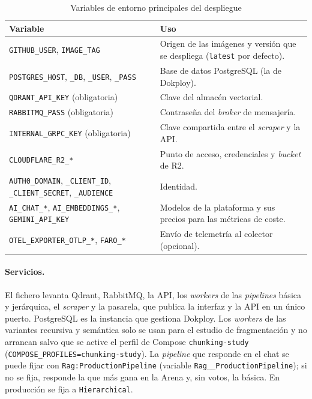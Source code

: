 \begin{table}[htbp]
\centering\small
\caption{Variables de entorno principales del despliegue}
\label{tab:variables-despliegue}
\begin{tabular}{@{}p{} p{}@{}}
\toprule
\textbf{Variable} & \textbf{Uso} \\
\midrule
\texttt{GITHUB\_USER}, \texttt{IMAGE\_TAG} & Origen de las imágenes y versión que se despliega (\texttt{latest} por defecto). \\
\texttt{POSTGRES\_HOST}, \texttt{\_DB}, \texttt{\_USER}, \texttt{\_PASS} & Base de datos PostgreSQL (la de Dokploy). \\
\texttt{QDRANT\_API\_KEY} (obligatoria) & Clave del almacén vectorial. \\
\texttt{RABBITMQ\_PASS} (obligatoria) & Contraseña del \emph{broker} de mensajería. \\
\texttt{INTERNAL\_GRPC\_KEY} (obligatoria) & Clave compartida entre el \emph{scraper} y la API. \\
\texttt{CLOUDFLARE\_R2\_*} & Punto de acceso, credenciales y \emph{bucket} de R2. \\
\texttt{AUTH0\_DOMAIN}, \texttt{\_CLIENT\_ID}, \texttt{\_CLIENT\_SECRET}, \texttt{\_AUDIENCE} & Identidad. \\
\texttt{AI\_CHAT\_*}, \texttt{AI\_EMBEDDINGS\_*}, \texttt{GEMINI\_API\_KEY} & Modelos de la plataforma y sus precios para las métricas de coste. \\
\texttt{OTEL\_EXPORTER\_OTLP\_*}, \texttt{FARO\_*} & Envío de telemetría al colector (opcional). \\
\bottomrule
\end{tabular}
\end{table}

\paragraph{Servicios.} El fichero levanta Qdrant, RabbitMQ, la API, los \emph{workers} de las \emph{pipelines} básica y jerárquica, el \emph{scraper} y la pasarela, que publica la interfaz y la API en un único puerto. PostgreSQL es la instancia que gestiona Dokploy. Los \emph{workers} de las variantes recursiva y semántica solo se usan para el estudio de fragmentación y no arrancan salvo que se active el perfil de Compose \texttt{chunking-study} (\texttt{COMPOSE\_PROFILES=chunking-study}). La \emph{pipeline} que responde en el chat se puede fijar con \texttt{Rag:ProductionPipeline} (variable \texttt{Rag\_\_ProductionPipeline}); si no se fija, responde la que más gana en la Arena y, sin votos, la básica. En producción se fija a \texttt{Hierarchical}.


